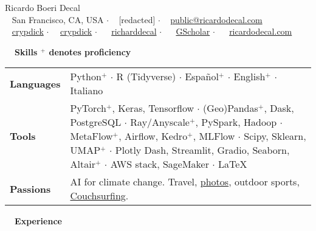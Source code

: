 \documentclass[a4paper,12pt]{article}
\newcommand{\resheading}[1]{{\vspace*{.001in} \colorbox{mygrey}{\begin{minipage}{\textwidth}{\textmd{\large \textbf{#1} \vphantom{p\^{E}}}}\end{minipage}}} }
\newcommand{\ressubheading}[4]{
    \textbf{#1} \hfill #2\\
    \textit{#3} \hfill #4 \\}
\begin{document}
    \begin{center}
    {\Huge Ricardo Boeri Decal}
        \\
        {\small \faMapMarker~ San Francisco, CA, USA $\cdot$ \faPhone~ [redacted] $\cdot$ \faEnvelope~ \href{mailto:public@ricardodecal.com}{public@ricardodecal.com}  \\ \faGithubAlt~ \href{https://github.com/crypdick}{crypdick} $\cdot$~\faStackOverflow~  \href{https://stackoverflow.com/users/4212158/crypdick}{crypdick} $\cdot$ ~\faLinkedin~ \href{https://www.linkedin.com/in/richarddecal/}{richarddecal} $\cdot$ ~\faGraduationCap~ \href{https://scholar.google.com/citations?user=4ODJ78oAAAAJ}{GScholar}  $\cdot$ ~\faHome~  \href{http://www.ricardodecal.com}{ricardodecal.com}}
    \end{center}

    \resheading{~~Skills \hfill {\small$^+$ denotes proficiency}}
    \vspace{-1em}
    \begin{tabularx}{\textwidth}{p{2.1cm}>{\arraybackslash}X}
        \bfseries{Languages} & Python$^+$ $\cdot$ R (Tidyverse) $\cdot$ Espa\~nol$^+$ $\cdot$ English$^+$ $\cdot$ Italiano                                                                                                                                                                                                   \\
        \bfseries{Tools}     & PyTorch$^+$, Keras, Tensorflow  $\cdot$ (Geo)Pandas$^+$, Dask, PostgreSQL $\cdot$ Ray/Anyscale$^+$, PySpark, Hadoop $\cdot$ MetaFlow$^+$, Airflow, Kedro$^+$, MLFlow $\cdot$ Scipy, Sklearn, UMAP$^+$ $\cdot$ Plotly Dash, Streamlit, Gradio, Seaborn, Altair$^+$  $\cdot$ AWS stack, SageMaker $\cdot$  \LaTeX \\
        \bfseries{Passions}  & AI for climate change. Travel, \href{https://www.flickr.com/photos/richarddecal/sets/72157640025469005/}{photos}, outdoor sports, \href{https://www.couchsurfing.com/people/rovingrichard/references}{Couchsurfing}.
    \end{tabularx}


    \resheading{~~Experience}
    \vspace{-1em}
\end{document}
